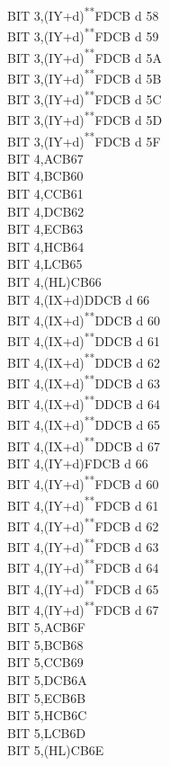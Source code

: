 \documentclass[12pt,twoside,openright,a4paper]{book}
\newcommand{\UNDOC}{\textnormal{\textsuperscript{**}}}
\begin{document}
\begin{multicols}{3}
{\begin{tabbing}
		BIT 3,(IY+d)\UNDOC\>FDCB d 58\\
		BIT 3,(IY+d)\UNDOC\>FDCB d 59\\
		BIT 3,(IY+d)\UNDOC\>FDCB d 5A\\
		BIT 3,(IY+d)\UNDOC\>FDCB d 5B\\
		BIT 3,(IY+d)\UNDOC\>FDCB d 5C\\
		BIT 3,(IY+d)\UNDOC\>FDCB d 5D\\
		BIT 3,(IY+d)\UNDOC\>FDCB d 5F\\
		BIT 4,A\>CB67\\
		BIT 4,B\>CB60\\
		BIT 4,C\>CB61\\
		BIT 4,D\>CB62\\
		BIT 4,E\>CB63\\
		BIT 4,H\>CB64\\
		BIT 4,L\>CB65\\
		BIT 4,(HL)\>CB66\\
		BIT 4,(IX+d)\>DDCB d 66\\
		BIT 4,(IX+d)\UNDOC\>DDCB d 60\\
		BIT 4,(IX+d)\UNDOC\>DDCB d 61\\
		BIT 4,(IX+d)\UNDOC\>DDCB d 62\\
		BIT 4,(IX+d)\UNDOC\>DDCB d 63\\
		BIT 4,(IX+d)\UNDOC\>DDCB d 64\\
		BIT 4,(IX+d)\UNDOC\>DDCB d 65\\
		BIT 4,(IX+d)\UNDOC\>DDCB d 67\\
		BIT 4,(IY+d)\>FDCB d 66\\
		BIT 4,(IY+d)\UNDOC\>FDCB d 60\\
		BIT 4,(IY+d)\UNDOC\>FDCB d 61\\
		BIT 4,(IY+d)\UNDOC\>FDCB d 62\\
		BIT 4,(IY+d)\UNDOC\>FDCB d 63\\
		BIT 4,(IY+d)\UNDOC\>FDCB d 64\\
		BIT 4,(IY+d)\UNDOC\>FDCB d 65\\
		BIT 4,(IY+d)\UNDOC\>FDCB d 67\\
		BIT 5,A\>CB6F\\
		BIT 5,B\>CB68\\
		BIT 5,C\>CB69\\
		BIT 5,D\>CB6A\\
		BIT 5,E\>CB6B\\
		BIT 5,H\>CB6C\\
		BIT 5,L\>CB6D\\
		BIT 5,(HL)\>CB6E\\

\end{tabbing}}
\end{multicols}
\end{document}
